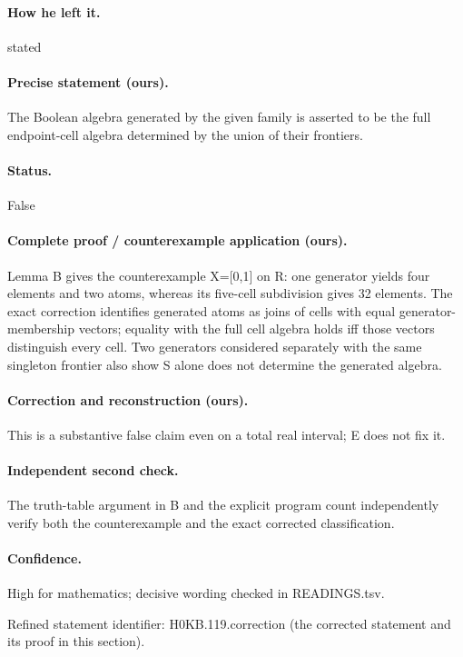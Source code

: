 \paragraph{How he left it.} stated

\paragraph{Precise statement (ours).} The Boolean algebra generated by the given family is asserted to be the full endpoint-cell algebra determined by the union of their frontiers.

\paragraph{Status.} False

\paragraph{Complete proof / counterexample application (ours).} Lemma B gives the counterexample X=[0,1] on R: one generator yields four elements and two atoms, whereas its five-cell subdivision gives 32 elements. The exact correction identifies generated atoms as joins of cells with equal generator-membership vectors; equality with the full cell algebra holds iff those vectors distinguish every cell. Two generators considered separately with the same singleton frontier also show S alone does not determine the generated algebra.

\paragraph{Correction and reconstruction (ours).} This is a substantive false claim even on a total real interval; E does not fix it.

\paragraph{Independent second check.} The truth-table argument in B and the explicit program count independently verify both the counterexample and the exact corrected classification.

\paragraph{Confidence.} High for mathematics; decisive wording checked in READINGS.tsv.

\noindent Refined statement identifier: H0KB.119.correction (the corrected statement and its proof in this section).

